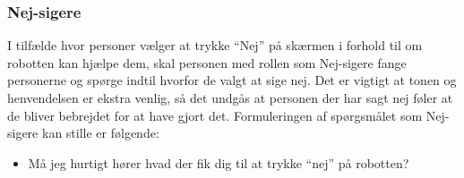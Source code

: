 \subsubsection*{Nej-sigere} 
I tilfælde hvor personer vælger at trykke ``Nej'' på skærmen i forhold til om robotten kan hjælpe dem, skal personen med rollen som Nej-sigere fange personerne og spørge indtil hvorfor de valgt at sige nej. Det er vigtigt at tonen og henvendelsen er ekstra venlig, så det undgås at personen der har sagt nej føler at de bliver bebrejdet for at have gjort det. Formuleringen af spørgsmålet som Nej-sigere kan stille er følgende: 
\begin{itemize}
	\item Må jeg hurtigt hører hvad der fik dig til at trykke ``nej'' på robotten? 
\end{itemize}